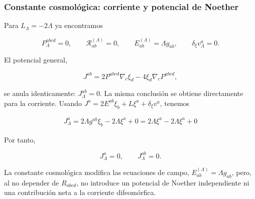 \documentclass{beamer}
\begin{document}
\begin{frame}[label=nav-frame-047]
	\frametitle{Constante cosmológica: corriente y potencial de Noether}
	\small

	Para $L_\Lambda=-2\Lambda$ ya encontramos

	\[
	P_\Lambda^{abcd}=0,
	\qquad
	\mathcal R_{ab}^{(\Lambda)}=0,
	\qquad
	E_{ab}^{(\Lambda)}=\Lambda g_{ab},
	\qquad
	\delta_\xi v_\Lambda^a=0.
	\]

	El potencial general,

	\[
	J^{ab}
	=
	2P^{abcd}\nabla_c\xi_d
	-
	4\xi_d\nabla_cP^{abcd},
	\]

	se anula identicamente: $J_\Lambda^{ab}=0$. La misma conclusión se obtiene directamente para la corriente. Usando $J^a = 2E^{ab}\xi_b + L\xi^a + \delta_\xi v^a$, tenemos

	\begin{align*}
		J_\Lambda^a
		= 2\Lambda g^{ab}\xi_b
		- 2\Lambda\xi^a
		+ 0 = 2\Lambda\xi^a-2\Lambda\xi^a + 0
	\end{align*}

	Por tanto,

	\[
	\boxed{
		J_\Lambda^a=0,
		\qquad
		J_\Lambda^{ab}=0.
	}
	\]

	La constante cosmológica modifica las ecuaciones de campo, $E_{ab}^{(\Lambda)}=\Lambda g_{ab}$, pero, al no depender de \(R_{abcd}\), no introduce un potencial de Noether independiente ni una contribución neta a la corriente difeomórfica.

\end{frame}










\end{document}
